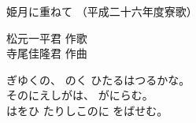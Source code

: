 \documentclass[10pt,b5j]{tarticle} %
\begin{document}
\begin{minipage}[c]{0.7\hsize} %
    \begin{center}
        {\LARGE
            姫月に重ねて %
        }
        {\small 
            （平成二十六年度寮歌） %
        }
    \end{center}
\end{minipage}
\begin{minipage}[c]{0.3\hsize} %
    \begin{flushright} %
        松元一平君 作歌\\寺尾佳隆君 作曲 %
    \end{flushright}
\end{minipage}

\vspace{1.5em} %
\newcommand{\linespace}{0.5em} %
\newcommand{\blocksize}{0.33\hsize} %
\newcommand{\itemmargin}{3em} %

ぎゆくの、
のく
ひたるはつるかな。\\
そのにえしがは、
がにらむ。\\
はをひ
たりしこのに
をばせむ。
\end{document}
